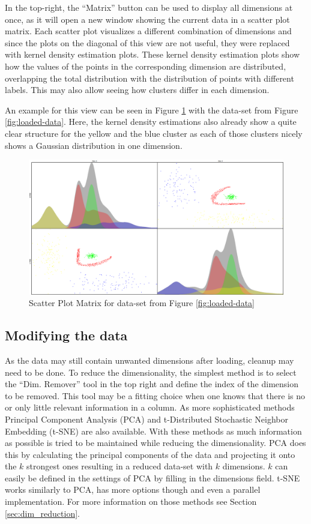 \documentclass[
	a4paper,
	english,
	twoside,
	openright,               
	11pt                            
	]{report}
\begin{document}
In the top-right, the ``Matrix'' button can be used to display all dimensions at once, as it will open a new window showing the current data in a scatter plot matrix. Each scatter plot visualizes a different combination of dimensions and since the plots on the diagonal of this view are not useful, they were replaced with kernel density estimation plots. These kernel density estimation plots show how the values of the points in the corresponding dimension are distributed, overlapping the total distribution with the distribution of points with different labels. This may also allow seeing how clusters differ in each dimension. 

An example for this view can be seen in Figure \ref{fig:scatter_matrix} with the data-set from Figure \ref{fig:loaded-data}. Here, the kernel density estimations also already show a quite clear structure for the yellow and the blue cluster as each of those clusters nicely shows a Gaussian distribution in one dimension.

\begin{figure}[h]
	\centering
	\includegraphics[scale=.25]{scatter_matrix}
	\caption{Scatter Plot Matrix for data-set from Figure \ref{fig:loaded-data}}
	\label{fig:scatter_matrix}
\end{figure}

\subsection{Modifying the data}

As the data may still contain unwanted dimensions after loading, cleanup may need to be done. To reduce the dimensionality, the simplest method is to select the ``Dim. Remover'' tool in the top right and define the index of the dimension to be removed. This tool may be a fitting choice when one knows that there is no or only little relevant information in a column. As more sophisticated methods Principal Component Analysis (PCA) \cite{pca} and t-Distributed Stochastic Neighbor Embedding (t-SNE) \cite{Maaten2008VisualizingDU} are also available. With these methods as much information as possible is tried to be maintained while reducing the dimensionality. PCA does this by calculating the principal components of the data and projecting it onto the $k$ strongest ones resulting in a reduced data-set with $k$ dimensions. $k$ can easily be defined in the settings of PCA by filling in the dimensions field. t-SNE works similarly to PCA, has more options though and even a parallel implementation. For more information on those methods see Section \ref{sec:dim_reduction}.
\end{document}
